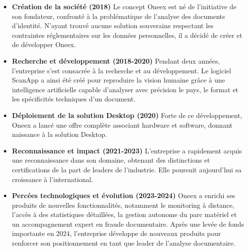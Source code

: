 \begin{itemize}
  \item \textbf{Création de la société (2018)}  
  Le concept Oneex est né de l’initiative de son fondateur, confronté à la problématique de l’analyse des documents d’identité. N’ayant trouvé aucune solution souveraine respectant les contraintes réglementaires sur les données personnelles, il a décidé de créer et de développer Oneex.

  \item \textbf{Recherche et développement (2018-2020)}  
  Pendant deux années, l’entreprise s’est consacrée à la recherche et au développement. Le logiciel ScanApp a ainsi été créé pour reproduire la vision humaine grâce à une intelligence artificielle capable d’analyser avec précision le pays, le format et les spécificités techniques d’un document.

  \item \textbf{Déploiement de la solution Desktop (2020)}  
  Forte de ce développement, Oneex a lancé une offre complète associant hardware et software, donnant naissance à la solution Desktop.

  \item \textbf{Reconnaissance et impact (2021-2023)}  
  L’entreprise a rapidement acquis une reconnaissance dans son domaine, obtenant des distinctions et certifications de la part de leaders de l’industrie. Elle poursuit aujourd’hui sa croissance à l’international.

  \item \textbf{Percées technologiques et évolution (2023-2024)}  
  Oneex a enrichi ses produits de nouvelles fonctionnalités, notamment le monitoring à distance, l’accès à des statistiques détaillées, la gestion autonome du parc matériel et un accompagnement expert en fraude documentaire. Après une levée de fonds importante en 2024, l’entreprise développe de nouveaux produits pour renforcer son positionnement en tant que leader de l’analyse documentaire.
\end{itemize}


